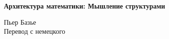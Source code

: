 \begin{titlepage}
    \centering
    \vspace*{\fill}

    \vspace*{0.5cm}

    \huge\bfseries
   Архитектура математики: Мышление структурами 

    \vspace*{0.5cm}

    \large Пьер Базье
    \\
    \large Перевод с немецкого

    \vspace*{\fill}
    \end{titlepage}

